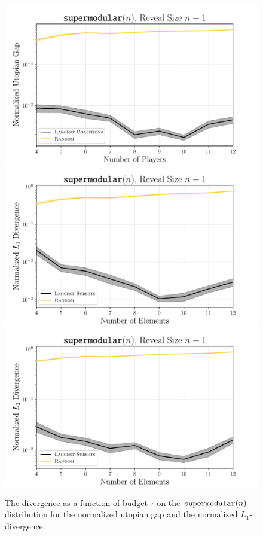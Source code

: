 \begin{figure}[t!]
  \centering
	\includegraphics[width=\stdfigwidth]{figures/exploitability_convex_linear.pdf}
	\includegraphics[width=\stdfigwidth]{figures/l1_norm_convex_linear.pdf}
	\includegraphics[width=\stdfigwidth]{figures/l2_norm_convex_linear.pdf}
	\caption{ The divergence as a function of budget $ \tau $ on the $ \texttt{supermodular}\!\left(n\right) $ distribution for the normalized utopian gap \citep[][Figure 3]{uradnik2024reducing} and the normalized $ L_1 $-divergence.}
	\label{fig:largest}
\end{figure}

